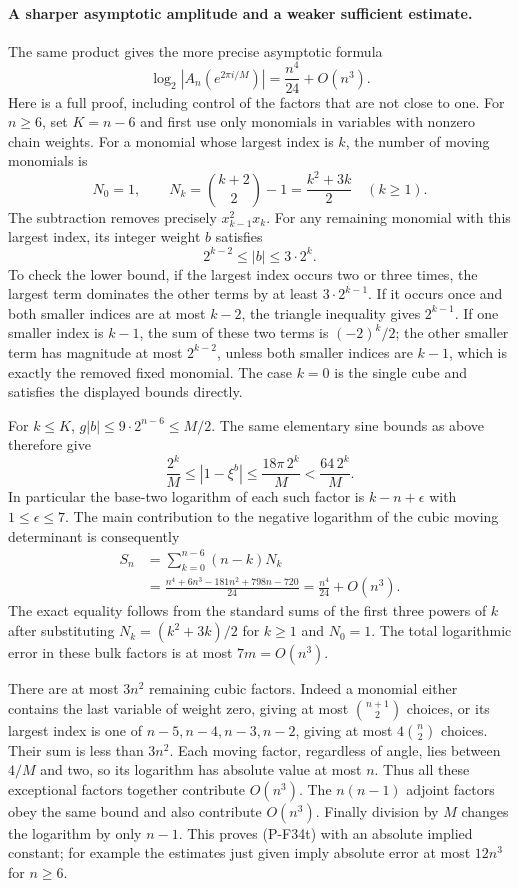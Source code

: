 \documentclass[11pt,a4paper]{article}
\begin{document}
\paragraph{A sharper asymptotic amplitude and a weaker sufficient estimate.}
The same product gives the more precise asymptotic formula
\[
 \log_2|A_n(e^{2\pi i/M})|=\frac{n^4}{24}+O(n^3).
 \tag{P-F34t}
\]
Here is a full proof, including control of the factors that are
not close to one. For $n\ge6$, set $K=n-6$ and first use only
monomials in variables with nonzero chain weights. For a monomial
whose largest index is $k$, the number of moving monomials is
\[
 N_0=1,\qquad N_k=\binom{k+2}{2}-1=\frac{k^2+3k}{2}
                      \quad(k\ge1).
\]
The subtraction removes precisely $x_{k-1}^2x_k$.
For any remaining monomial with this largest index, its integer
weight $b$ satisfies
\[
                       2^{k-2}\le |b|\le3\cdot2^k.
\]
To check the lower bound, if the largest index occurs two or
three times, the largest term dominates the other terms by at
least $3\cdot2^{k-1}$. If it occurs once and both smaller indices
are at most $k-2$, the triangle inequality gives $2^{k-1}$.
If one smaller index is $k-1$, the sum of these two terms is
$(-2)^k/2$; the other smaller term has magnitude at most
$2^{k-2}$, unless both smaller indices are $k-1$, which is
exactly the removed fixed monomial. The case $k=0$ is the
single cube and satisfies the displayed bounds directly.

For $k\le K$, $g|b|\le9\cdot2^{n-6}\le M/2$.
The same elementary sine bounds as above therefore give
\[
 \frac{2^k}{M}\le |1-\xi^b|
       \le\frac{18\pi\,2^k}{M}<\frac{64\,2^k}{M}.
\]
In particular the base-two logarithm of each such factor is
$k-n+\epsilon$ with $1\le\epsilon\le7$.
The main contribution to the negative logarithm of the cubic
moving determinant is consequently
\begin{align*}
 S_n&=\sum_{k=0}^{n-6}(n-k)N_k\\
    &=\frac{n^4+6n^3-181n^2+798n-720}{24}
      =\frac{n^4}{24}+O(n^3).
\end{align*}
The exact equality follows from the standard sums of the first
three powers of $k$ after substituting
$N_k=(k^2+3k)/2$ for $k\ge1$ and $N_0=1$.
The total logarithmic error in these bulk factors is at most
$7m=O(n^3)$.

There are at most $3n^2$ remaining cubic factors. Indeed a
monomial either contains the last variable of weight zero,
giving at most $\binom{n+1}{2}$ choices, or its largest index
is one of $n-5,n-4,n-3,n-2$, giving at most
$4\binom n2$ choices. Their sum is less than $3n^2$.
Each moving factor, regardless of angle, lies between $4/M$
and two, so its logarithm has absolute value at most $n$.
Thus all these exceptional factors together contribute
$O(n^3)$. The $n(n-1)$ adjoint factors obey the same bound
and also contribute $O(n^3)$. Finally division by $M$ changes
the logarithm by only $n-1$. This proves (P-F34t) with an
absolute implied constant; for example the estimates just
given imply absolute error at most $12n^3$ for $n\ge6$.
\end{document}
